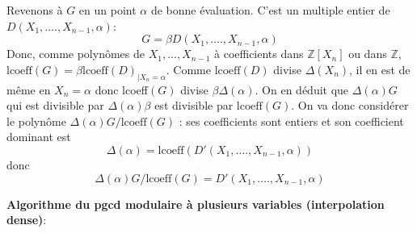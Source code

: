 \documentclass[a4paper,11pt]{article}
\begin{document}
Revenons à $G$ en un point $\alpha$ de bonne évaluation. C'est un multiple
entier de $D ( X_1, \ldots ., X_{n - 1}, \alpha )$:
\[ G = \beta D ( X_1, \ldots ., X_{n - 1}, \alpha ) \]
Donc, comme polynômes de $X_1,...,X_{n-1}$ à coefficients dans 
$\mathbb{Z}[X_n]$ ou dans $\mathbb{Z}$,
$\mbox{lcoeff} ( G ) = \beta \mbox{lcoeff} ( D )_{| X_n = \alpha}$. Comme
$\mbox{lcoeff} ( D )$ divise $\Delta ( X_n )$, il en est de même en $X_n =
\alpha$ donc lcoeff$(G)$ divise $\beta \Delta(\alpha)$. 
On en déduit que $ \Delta ( \alpha) G$ qui 
est divisible par $ \Delta (\alpha) \beta$ est
divisible par $\mbox{lcoeff} ( G )$. On va donc considérer le polynôme
$ \Delta (\alpha) G  / \mbox{lcoeff} ( G )$ :
ses coefficients sont entiers et son coefficient dominant est  
$$\Delta ( \alpha) = \mbox{lcoeff}(D'( X_1, \ldots ., X_{n - 1}, \alpha ))$$
donc
\[ \Delta (\alpha) G  / \mbox{lcoeff} ( G )=
D'( X_1, \ldots ., X_{n - 1}, \alpha )\]

{\bf{Algorithme du pgcd modulaire à plusieurs variables (interpolation
dense)}}:
\end{document}
